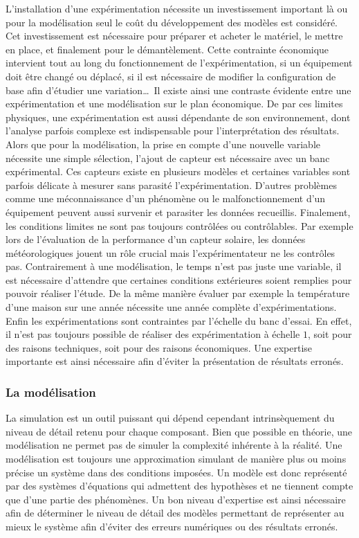L’installation d’une expérimentation nécessite un investissement important là ou pour la
modélisation seul le coût du développement des modèles est considéré. Cet investissement
est nécessaire pour préparer et acheter le matériel, le mettre en place, et finalement
pour le démantèlement. Cette contrainte économique intervient tout au long du
fonctionnement de l’expérimentation, si un équipement doit être changé ou déplacé, si il
est nécessaire de modifier la configuration de base afin d’étudier une variation\dots\ Il
existe ainsi une contraste évidente entre une expérimentation et une modélisation sur le
plan économique. De par ces limites physiques, une expérimentation est aussi dépendante de
son environnement, dont l’analyse parfois complexe est indispensable pour l’interprétation
des résultats. Alors que pour la modélisation, la prise en compte d’une nouvelle variable
nécessite une simple sélection, l’ajout de capteur est nécessaire avec un banc expérimental.
Ces capteurs existe en plusieurs modèles et certaines variables sont
parfois délicate à mesurer sans parasité l’expérimentation. D’autres problèmes comme une
méconnaissance d’un phénomène ou le malfonctionnement d’un équipement peuvent aussi
survenir et parasiter les données recueillis. Finalement, les conditions limites ne sont
pas toujours contrôlées ou contrôlables. Par exemple lors de l’évaluation de la
performance d’un capteur solaire, les données météorologiques jouent un rôle crucial mais
l’expérimentateur ne les contrôles pas. Contrairement à une modélisation, le temps n’est
pas juste une variable, il est nécessaire d’attendre que certaines conditions extérieures
soient remplies pour pouvoir réaliser l’étude. De la même manière évaluer par exemple la
température d’une maison sur une année nécessite une année complète d’expérimentations.
Enfin les expérimentations sont contraintes par l’échelle du banc d’essai. En effet, il n’est pas
toujours possible de réaliser des expérimentation à échelle $1$, soit pour des raisons
techniques, soit pour des raisons économiques. Une expertise importante est ainsi
nécessaire afin d’éviter la présentation de résultats erronés.


\subsubsection{La modélisation} %
\label{ssub:la_modelisation}
La simulation est un outil puissant qui dépend cependant intrinsèquement du niveau de
détail retenu pour chaque composant. Bien que possible en théorie, une modélisation ne
permet pas de simuler la complexité inhérente à la réalité. Une modélisation est toujours
une approximation simulant de manière plus ou moins précise un système dans des conditions
imposées. Un modèle est donc représenté par des systèmes d’équations qui admettent des
hypothèses et ne tiennent compte que d’une partie des phénomènes. Un bon niveau
d’expertise est ainsi nécessaire afin de déterminer le niveau de détail des modèles
permettant de représenter au mieux le système afin d’éviter des erreurs numériques ou
des résultats erronés.

